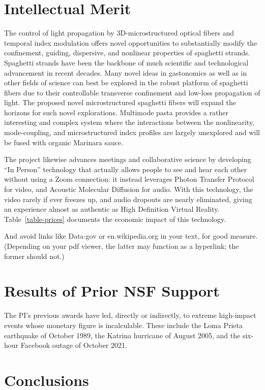 \documentclass[11pt]{article} %
\newcommand{\pseudodot}{{\lower 2.4pt\hbox{$\cdot$}}}
\begin{document}
\section{Intellectual Merit}

The control of light propagation by 3D-microstructured optical fibers and temporal index modulation offers novel opportunities to substantially modify the confinement, guiding, dispersive, and nonlinear properties of spaghetti strands. Spaghetti strands have been the backbone of much scientific and technological advancement in recent decades. Many novel ideas in gastonomics as well as in other fields of science can best be explored in the robust platform of spaghetti fibers due to their controllable transverse confinement and low-loss propagation of light. The proposed novel microstructured spaghetti fibers will expand the horizons for such novel explorations. Multimode pasta provides a rather interesting and complex system where the interactions between the nonlinearity, mode-coupling, and microstructured index profiles are largely unexplored and will be fused with organic Marinara sauce.

The project likewise advances meetings and collaborative science by developing ``In Person'' technology that actually allows people to see and hear each other without using a Zoom connection: it instead leverages Photon Transfer Protocol for video, and Acoustic Molecular Diffusion for audio. With this technology, the video rarely if ever freezes up, and audio dropouts are nearly eliminated, giving an experience almost as authentic as High Definition Virtual Reality. Table~\ref{table-prices} documents the economic impact of this technology.

And avoid links like Data{\pseudodot}gov or en.wikipedia.org in your text, for good measure. (Depending on your pdf viewer, the latter may function as a hyperlink; the former should not.)

\section{Results of Prior NSF Support}

The PI's previous awards have led, directly or indirectly, to extreme high-impact events whose monetary figure is incalculable. These include the Loma Prieta earthquake of October 1989, the Katrina hurricane of August 2005, and the six-hour Facebook outage of October 2021.

\section{Conclusions}
\end{document}
